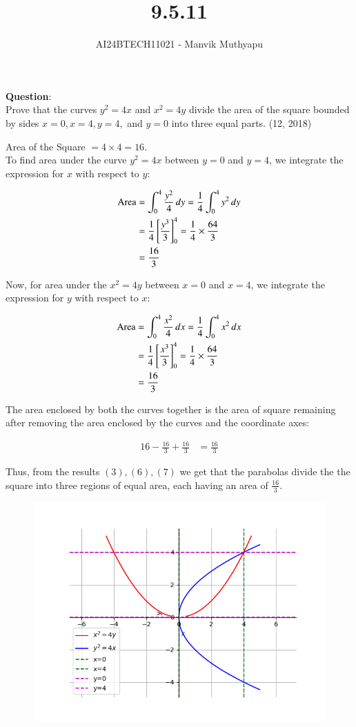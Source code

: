 \documentclass[journal,12pt,onecolumn]{IEEEtran}
\title{9.5.11}
\author{AI24BTECH11021 - Manvik Muthyapu}
\theoremstyle{remark}
\begin{document}


\maketitle
\bigskip

\renewcommand{\thefigure}{\theenumi}
\renewcommand{\thetable}{\theenumi}


\textbf{Question}:\\
Prove that the curves $y^2 = 4x$ and $x^2 = 4y$ divide the area of the square bounded by sides $x=0, x=4, y=4,$ and $y=0$ into three equal parts.
\hfill{(12, 2018)}

\solution
Area of the Square $= 4 \times 4 = 16$.\\
To find area under the curve $y^2 = 4x$ between $y = 0$ and $y = 4$, we integrate the expression for $x$ with respect to $y$:

\begin{align}
	\text{Area} &= \int_0^4 \frac{y^2}{4} \, dy = \frac{1}{4} \int_0^4 y^2 \, dy \\
	&= \frac{1}{4} {}\left[\frac{y^3}{3}\right]_0^4 = \frac{1}{4} \times \frac{64}{3} \\
	&= \frac{16}{3}
\end{align}

Now, for area under the $x^2 = 4y$ between $x = 0$ and $x = 4$, we integrate the expression for $y$ with respect to $x$:

\begin{align}
	\text{Area} &= \int_0^4 \frac{x^2}{4} \, dx = \frac{1}{4} \int_0^4 x^2 \, dx \\
	&= \frac{1}{4} {}\left[\frac{x^3}{3}\right]_0^4 = \frac{1}{4} \times \frac{64}{3} \\
	&= \frac{16}{3}
\end{align}

The area enclosed by both the curves together is the area of square remaining after removing the area enclosed by the curves and the coordinate axes:

\begin{align}
	16 - \frac{16}{3} + \frac{16}{3} &= \frac{16}{3}
\end{align}

Thus, from the results $(3),(6),(7)$ we get that the parabolas divide the the square into three regions of equal area, each having an area of $\frac{16}{3}$.

\begin{figure}[h!]
	\centering
	\includegraphics[width=0.7\linewidth]{figs/plot.png}
\end{figure}
\end{document}
